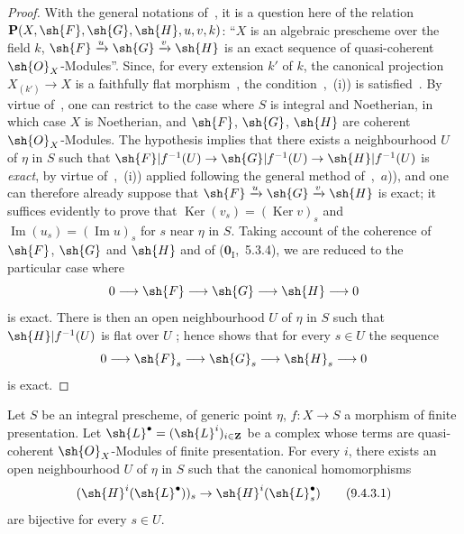 \begin{proof}
With the general notations of~, it is a question here of the relation $\mathbf{P}(X,\sh{F},\sh{G},\sh{H},u,v,k)$: ``$X$ is an algebraic prescheme over the field $k$, $\sh{F}\xrightarrow{u}\sh{G}\xrightarrow{v}\sh{H}$ is an exact sequence of quasi-coherent $\sh{O}_X$-Modules''.
Since, for every extension $k'$ of $k$, the canonical projection $X_{(k')}\to X$ is a faithfully flat morphism~, the condition~,~(i)) is satisfied~.
By virtue of~, one can restrict to the case where $S$ is integral and Noetherian, in which case $X$ is Noetherian, and $\sh{F}$, $\sh{G}$, $\sh{H}$ are coherent $\sh{O}_X$-Modules.
The hypothesis implies that there exists a neighbourhood $U$ of $\eta$ in $S$ such that $\sh{F}|f^{-1}(U)\to\sh{G}|f^{-1}(U)\to\sh{H}|f^{-1}(U)$ is \emph{exact}, by virtue of~,~(i)) applied following the general method of~,~$a$)), and one can therefore already suppose that $\sh{F}\xrightarrow{u}\sh{G}\xrightarrow{v}\sh{H}$ is exact; it suffices evidently to prove that $\operatorname{Ker}(v_s)=(\operatorname{Ker} v)_s$ and $\operatorname{Im}(u_s)=(\operatorname{Im} u)_s$ for $s$ near $\eta$ in $S$.
Taking account of the coherence of $\sh{F}$, $\sh{G}$ and $\sh{H}$ and of
($\mathbf{0}_{\mathrm{I}}$,~5.3.4), we are reduced to the particular case where
\[
 0\longrightarrow\sh{F}\longrightarrow\sh{G}\longrightarrow\sh{H}
 \longrightarrow0
\]
is exact.
There is then an open neighbourhood $U$ of $\eta$ in $S$ such that
$\sh{H}|f^{-1}(U)$ is flat over $U$ ; hence 
shows that for every $s\in U$ the sequence
\[
 0\longrightarrow\sh{F}_s\longrightarrow\sh{G}_s\longrightarrow\sh{H}_s
 \longrightarrow0
\]
is exact.
\end{proof}


\begin{corollary}[9.4.3]
\label{IV.9.4.3}
Let $S$ be an integral prescheme, of generic point $\eta$, $f:X\to S$ a morphism of finite presentation.
Let $\sh{L}^\bullet=(\sh{L}^i)_{i\in\mathbf{Z}}$ be a complex whose terms are quasi-coherent $\sh{O}_X$-Modules of finite presentation.
For every $i$, there exists an open neighbourhood $U$ of $\eta$ in $S$ such that the canonical homomorphisms
\begin{equation}
\label{IV.9.4.3.1}
  (\sh{H}^i(\sh{L}^\bullet))_s\to\sh{H}^i(\sh{L}^\bullet_s) \tag{9.4.3.1}
\end{equation}
are bijective for every $s\in U$.
\end{corollary}


